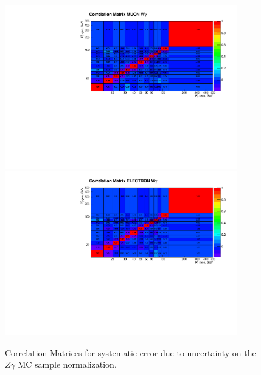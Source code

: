 \begin{figure}[htb]
  \begin{center}
   \includegraphics[width=0.90\textwidth]{../figs/figs_v11/MUON_WGamma/Constants/matrCorrelation_syst_ZgMC_Norm.pdf}\\
\includegraphics[width=0.90\textwidth]{../figs/figs_v11/ELECTRON_WGamma/Constants/matrCorrelation_syst_ZgMC_Norm.pdf}
  \caption{Correlation Matrices for systematic error due to uncertainty on the $Z\gamma$ MC sample normalization.}
  \label{fig:corrMatrices_syst_ZgMC_Norm_Wg}
  \end{center}
\end{figure}

